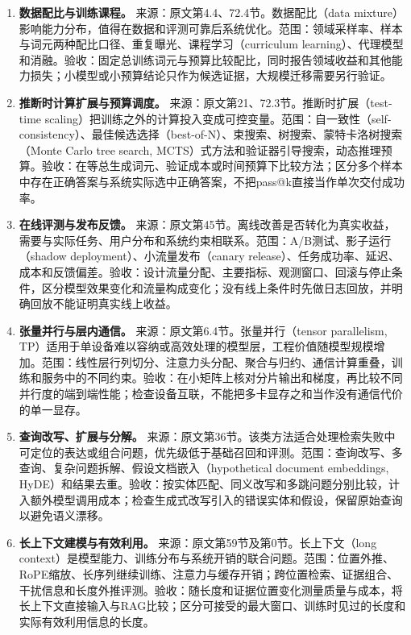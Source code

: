 \documentclass[UTF8,12pt,a4paper,fontset=fandol]{ctexart}
\begin{document}
\begin{enumerate}[resume=techrank]
\item \textbf{数据配比与训练课程。}\label{tech:mixture}
来源：原文第4.4、72.4节。数据配比（data mixture）影响能力分布，值得在数据和评测可靠后系统优化。范围：领域采样率、样本与词元两种配比口径、重复曝光、课程学习（curriculum learning）、代理模型和消融。验收：固定总训练词元与预算比较配比，同时报告领域收益和其他能力损失；小模型或小预算结论只作为候选证据，大规模迁移需要另行验证。

\item \textbf{推断时计算扩展与预算调度。}\label{tech:testtime}
来源：原文第21、72.3节。推断时扩展（test-time scaling）把训练之外的计算投入变成可控变量。范围：自一致性（self-consistency）、最佳候选选择（best-of-N）、束搜索、树搜索、蒙特卡洛树搜索（Monte Carlo tree search, MCTS）式方法和验证器引导搜索，动态推理预算。验收：在等总生成词元、验证成本或时间预算下比较方法；区分多个样本中存在正确答案与系统实际选中正确答案，不把pass@k直接当作单次交付成功率。

\item \textbf{在线评测与发布反馈。}\label{tech:online}
来源：原文第45节。离线改善是否转化为真实收益，需要与实际任务、用户分布和系统约束相联系。范围：A/B测试、影子运行（shadow deployment）、小流量发布（canary release）、任务成功率、延迟、成本和反馈偏差。验收：设计流量分配、主要指标、观测窗口、回滚与停止条件，区分模型效果变化和流量构成变化；没有线上条件时先做日志回放，并明确回放不能证明真实线上收益。

\item \textbf{张量并行与层内通信。}\label{tech:tp}
来源：原文第6.4节。张量并行（tensor parallelism, TP）适用于单设备难以容纳或高效处理的模型层，工程价值随模型规模增加。范围：线性层行列切分、注意力头分配、聚合与归约、通信计算重叠，训练和服务中的不同约束。验收：在小矩阵上核对分片输出和梯度，再比较不同并行度的端到端性能；检查设备互联，不能把多卡显存之和当作没有通信代价的单一显存。

\item \textbf{查询改写、扩展与分解。}\label{tech:query}
来源：原文第36节。该类方法适合处理检索失败中可定位的表达或组合问题，优先级低于基础召回和评测。范围：查询改写、多查询、复杂问题拆解、假设文档嵌入（hypothetical document embeddings, HyDE）和结果去重。验收：按实体匹配、同义改写和多跳问题分别比较，计入额外模型调用成本；检查生成式改写引入的错误实体和假设，保留原始查询以避免语义漂移。

\item \textbf{长上下文建模与有效利用。}\label{tech:longcontext}
来源：原文第59节及第0节。长上下文（long context）是模型能力、训练分布与系统开销的联合问题。范围：位置外推、RoPE缩放、长序列继续训练、注意力与缓存开销；跨位置检索、证据组合、干扰信息和长度外推评测。验收：随长度和证据位置变化测量质量与成本，将长上下文直接输入与RAG比较；区分可接受的最大窗口、训练时见过的长度和实际有效利用信息的长度。


\end{enumerate}
\end{document}
